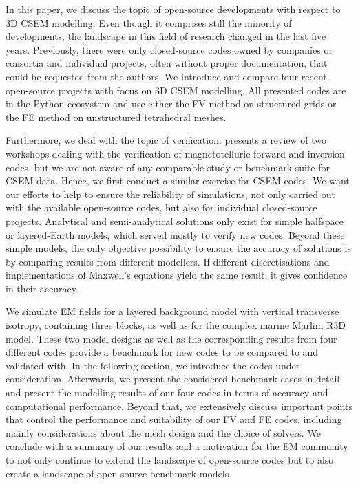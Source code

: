 \documentclass[
    paper,
  ]{geophysics}
\begin{document}
In this paper, we discuss the topic of open-source developments with respect to 3D CSEM modelling. Even though it comprises still the minority of developments, the landscape in this field of research changed in the last five years. Previously, there were only closed-source codes owned by companies or consortia and individual projects, often without proper documentation, that could be requested from the authors. We introduce and compare four recent open-source projects with focus on 3D CSEM modelling. All presented codes are in the Python ecosystem and use either the FV method on structured grids or the FE method on unstructured tetrahedral meshes.

Furthermore, we deal with the topic of verification. \cite{GJI.13.Miensopust} presents a review of two workshops dealing with the verification of magnetotelluric forward and inversion codes, but we are not aware of any comparable study or benchmark suite for CSEM data. Hence, we first conduct a similar exercise for CSEM codes. We want our efforts to help to ensure the reliability of simulations, not only carried out with the available open-source codes, but also for individual closed-source projects. Analytical and semi-analytical solutions only exist for simple halfspace or layered-Earth models, which served mostly to verify new codes. Beyond these simple models, the only objective possibility to ensure the accuracy of solutions is by comparing results from different modellers. If different discretisations and implementations of Maxwell's equations yield the same result, it gives confidence in their accuracy.

We simulate EM fields for a layered background model with vertical transverse isotropy, containing three blocks, as well as for the complex marine Marlim R3D model. These two model designs as well as the corresponding results from four different codes provide a benchmark for new codes to be compared to and validated with. In the following section, we introduce the codes under consideration. Afterwards, we present the considered benchmark cases in detail and present the modelling results of our four codes in terms of accuracy and computational performance. Beyond that, we extensively discuss important points that control the performance and suitability of our FV and FE codes, including mainly considerations about the mesh design and the choice of solvers. We conclude with a summary of our results and a motivation for the EM community to not only continue to extend the landscape of open-source codes but to also create a landscape of open-source benchmark models.
\end{document}
